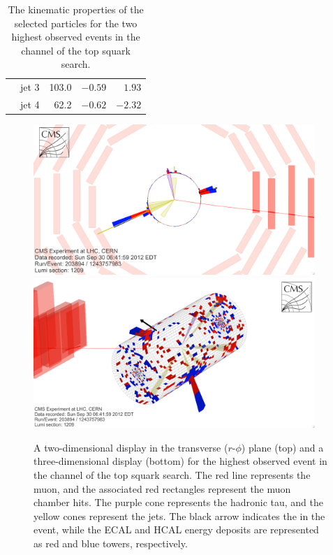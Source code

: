 \begin{table}[htbp]
\begin{tabular}{|r|l|r|r|r|}
                                           & jet 3                         &  103.0                              & $-0.59$                     & $ 1.93$ \\
                                           & jet 4                         &   62.2                              & $-0.62$                     & $-2.32$ \\
      \hline
    \end{tabular}
    \caption{The kinematic properties of the selected particles for the two highest \ST observed events in the \mutau channel of the top squark search.}    
    \label{tab:lqd-evt}
\end{table}

\begin{figure}[hbtp]
\begin{center}
\includegraphics[width=0.95\textwidth]{figures/eventdisplays/LQD_evt1_rphi.png}
\includegraphics[width=0.95\textwidth]{figures/eventdisplays/LQD_evt1_3D.png}
\caption{A two-dimensional display in the transverse ($r$-$\phi$) plane (top) and a three-dimensional display (bottom) for the highest \ST observed event in the \mutau channel of the top squark search. The red line represents the muon, and the associated red rectangles represent the muon chamber hits. The purple cone represents the hadronic tau, and the yellow cones represent the jets. The black arrow indicates the \met in the event, while the ECAL and HCAL energy deposits are represented as red and blue towers, respectively. }
\label{fig:lqd-evt1}
\end{center}
\end{figure}

